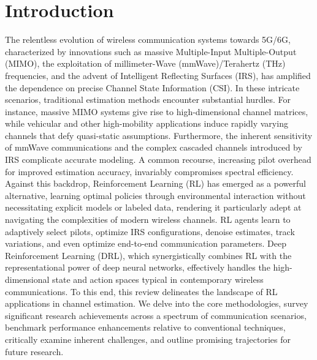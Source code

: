 \documentclass[journal,twocolumn]{IEEEtran}
\begin{document}
%
\IEEEpeerreviewmaketitle



\section{Introduction}

The relentless evolution of wireless communication systems towards 5G/6G, characterized by innovations such as massive Multiple-Input Multiple-Output (MIMO), the exploitation of millimeter-Wave (mmWave)/Terahertz (THz) frequencies, and the advent of Intelligent Reflecting Surfaces (IRS), has amplified the dependence on precise Channel State Information (CSI). In these intricate scenarios, traditional estimation methods encounter substantial hurdles. For instance, massive MIMO systems give rise to high-dimensional channel matrices, while vehicular and other high-mobility applications induce rapidly varying channels that defy quasi-static assumptions. Furthermore, the inherent sensitivity of mmWave communications and the complex cascaded channels introduced by IRS complicate accurate modeling. A common recourse, increasing pilot overhead for improved estimation accuracy, invariably compromises spectral efficiency. Against this backdrop, Reinforcement Learning (RL) has emerged as a powerful alternative, learning optimal policies through environmental interaction without necessitating explicit models or labeled data, rendering it particularly adept at navigating the complexities of modern wireless channels. RL agents learn to adaptively select pilots, optimize IRS configurations, denoise estimates, track variations, and even optimize end-to-end communication parameters. Deep Reinforcement Learning (DRL), which synergistically combines RL with the representational power of deep neural networks, effectively handles the high-dimensional state and action spaces typical in contemporary wireless communications. To this end, this review delineates the landscape of RL applications in channel estimation. We delve into the core methodologies, survey significant research achievements across a spectrum of communication scenarios, benchmark performance enhancements relative to conventional techniques, critically examine inherent challenges, and outline promising trajectories for future research.
\end{document}
